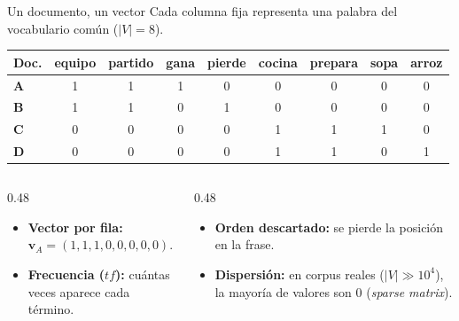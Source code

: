 \documentclass[aspectratio=169,10pt]{beamer}
\begin{document}
\begin{frame}[label={sec:orge6038ab}]{Un documento, un vector}
\vspace{-0.5em}
Cada columna fija representa una palabra del \alert{vocabulario común} ($|V| = 8$).

\smallskip
\begin{center}
\small
\begin{tabular}{lcccccccc}
\toprule
\textbf{Doc.} & \textbf{equipo} & \textbf{partido} & \textbf{gana} & \textbf{pierde} & \textbf{cocina} & \textbf{prepara} & \textbf{sopa} & \textbf{arroz} \\
\midrule
\textbf{A} & 1 & 1 & 1 & 0 & 0 & 0 & 0 & 0 \\
\textbf{B} & 1 & 1 & 0 & 1 & 0 & 0 & 0 & 0 \\
\textbf{C} & 0 & 0 & 0 & 0 & 1 & 1 & 1 & 0 \\
\textbf{D} & 0 & 0 & 0 & 0 & 1 & 1 & 0 & 1 \\
\bottomrule
\end{tabular}
\end{center}

\smallskip
\begin{columns}[T,onlytextwidth]
  \begin{column}{0.48\textwidth}
    \begin{itemize}\setlength{\itemsep}{0.2em}
      \item \textbf{Vector por fila:} $\mathbf{v}_A = (1, 1, 1, 0, 0, 0, 0, 0)$.
      \item \textbf{Frecuencia ($tf$):} cuántas veces aparece cada término.
    \end{itemize}
  \end{column}
  \begin{column}{0.48\textwidth}
    \begin{itemize}\setlength{\itemsep}{0.2em}
      \item \textbf{Orden descartado:} se pierde la posición en la frase.
      \item \textbf{Dispersión:} en corpus reales ($|V| \gg 10^4$), la mayoría de valores son $0$ (\textit{sparse matrix}).
    \end{itemize}
  \end{column}
\end{columns}
\end{frame}
\end{document}

